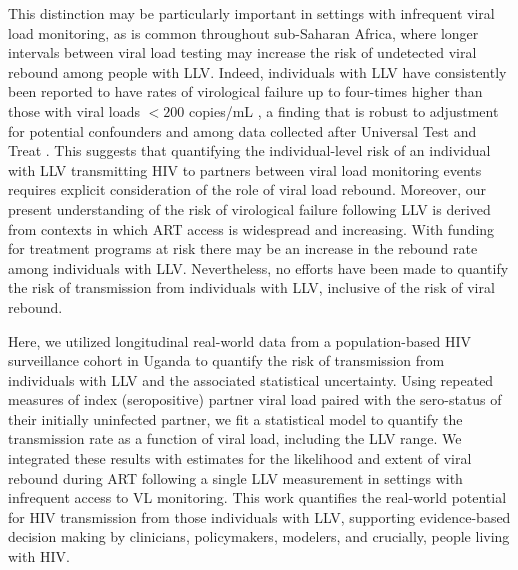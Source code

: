 \documentclass{article}[11pt]
\begin{document}
This distinction may be particularly important in settings with infrequent viral load monitoring, as is common throughout sub-Saharan Africa, where longer intervals between viral load testing may increase the risk of undetected viral rebound among people with LLV. Indeed, individuals with LLV have consistently been reported to have rates of virological failure up to four-times higher than those with viral loads $<200$ copies/mL \cite{nzivo2023, antiretroviraltherapycohort2015, laprise2013, fleming2019}, a finding that is robust to adjustment for potential confounders \cite{laprise2013, fleming2019} and among data collected after Universal Test and Treat \cite{rosen2024}. This suggests that quantifying the individual-level risk of an individual with LLV transmitting HIV to partners between viral load monitoring events requires explicit consideration of the role of viral load rebound. Moreover, our present understanding of the risk of virological failure following LLV is derived from contexts in which ART access is widespread and increasing. With funding for treatment programs at risk \cite{ratevosian2026} there may be an increase in the rebound rate among individuals with LLV. Nevertheless, no efforts have been made to quantify the risk of transmission from individuals with LLV, inclusive of the risk of viral rebound.

Here, we utilized longitudinal real-world data from a population-based HIV surveillance cohort in Uganda to quantify the risk of transmission from individuals with LLV and the associated statistical uncertainty. Using repeated measures of index (seropositive) partner viral load paired with the sero-status of their initially uninfected partner, we fit a statistical model to quantify the transmission rate as a function of viral load, including the LLV range. We integrated these results with estimates for the likelihood and extent of viral rebound during ART following a single LLV measurement in settings with infrequent access to VL monitoring. This work quantifies the real-world potential for HIV transmission from those individuals with LLV, supporting evidence-based decision making by clinicians, policymakers, modelers, and crucially, people living with HIV.
\end{document}
